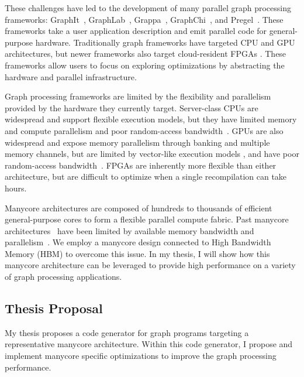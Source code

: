 These challenges have led to the development of many parallel graph processing frameworks: GraphIt~\cite{zhang2018graphit}, GraphLab~\cite{low2010graphlab, low2012distributed}, Grappa~\cite{nelson2015grappa}, GraphChi~\cite{aapo2012graphchi}, and Pregel~\cite{malewicz2010pregel}. 
These frameworks take a user application description and emit parallel code for general-purpose hardware.
Traditionally graph frameworks have targeted CPU and GPU architectures, but newer frameworks also target cloud-resident FPGAs \cite{engelhardt2016gravf, dai2016fpgp}.
These frameworks allow users to focus on exploring optimizations by abstracting the hardware and parallel infrastructure.

Graph processing frameworks are limited by the flexibility and parallelism provided by the hardware they currently target.
Server-class CPUs are widespread and support flexible execution models, but they have limited memory and compute parallelism and poor random-access bandwidth~\citep{beamer2015locality}.
GPUs are also widespread and expose memory parallelism through banking and multiple memory channels, but are limited by vector-like execution models \cite{xu2014graph, shi2018graph}, and have poor random-access bandwidth~\citep{aamodt2018general}.
FPGAs are inherently more flexible than either architecture, but are difficult to optimize when a single recompilation can take hours. 
  
Manycore architectures are composed of hundreds to thousands of efficient general-purpose cores to form a flexible parallel compute fabric.
Past manycore architectures~\cite{ramey2011tilera, agathos2015parallela, gwennap2011adapteva} have been limited by available memory bandwidth and parallelism~\citep{loi2010efficient}.  We employ a manycore design connected to High Bandwidth Memory (HBM) \cite{jedec2020hbm, jouppi2017datacenter} to overcome this issue.
In my thesis, I will show how this manycore architecture can be leveraged to provide high performance on a variety of graph processing applications.


\subsection{Thesis Proposal}
My thesis proposes a code generator for graph programs targeting a representative manycore architecture. 
Within this code generator, I propose and implement manycore specific optimizations to improve the graph processing performance. 

